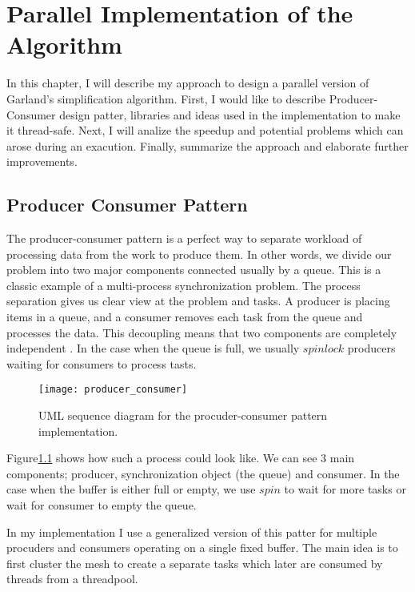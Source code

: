 \chapter{Parallel Implementation of the Algorithm}

In this chapter, I will describe my approach to design a parallel version of Garland's simplification algorithm. First, I would like to describe Producer-Consumer design patter, libraries and ideas used in the implementation to make it thread-safe. Next, I will analize the speedup and potential problems which can arose during an exacution. Finally, summarize the approach and elaborate further improvements.

\section{Producer Consumer Pattern}

The producer-consumer pattern is a perfect way to separate workload of processing data from the work to produce them. In other words, we divide our problem into two major components connected usually by a queue. This is a classic example of a multi-process synchronization problem. The process separation gives us clear view at the problem and tasks. A producer is placing items in a queue, and a consumer removes each task from the queue and processes the data. This decoupling means that two components are completely independent \cite{grand02}. In the case when the queue is full, we usually $spinlock$ producers waiting for consumers to process tasts.

\begin{figure}[H]
  \begin{center}
    \texttt{[image: producer\_consumer]}
    \caption{UML sequence diagram for the procuder-consumer pattern implementation.}
    \label{fig:uml}
  \end{center}
\end{figure}

Figure\ref{fig:uml} shows how such a process could look like. We can see 3 main components; producer, synchronization object (the queue) and consumer. In the case when the buffer is either full or empty, we use $spin$ to wait for more tasks or wait for consumer to empty the queue.

In my implementation I use a generalized version of this patter for multiple procuders and consumers operating on a single fixed buffer. The main idea is to first cluster the mesh to create a separate tasks which later are consumed by threads from a threadpool.

